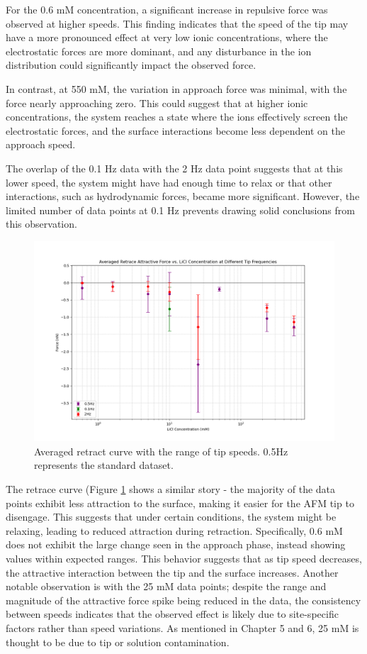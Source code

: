 For the 0.6 mM concentration, a significant increase in repulsive force was observed at higher speeds. This finding indicates that the speed of the tip may have a more pronounced effect at very low ionic concentrations, where the electrostatic forces are more dominant, and any disturbance in the ion distribution could significantly impact the observed force.

In contrast, at 550 mM, the variation in approach force was minimal, with the force nearly approaching zero. This could suggest that at higher ionic concentrations, the system reaches a state where the ions effectively screen the electrostatic forces, and the surface interactions become less dependent on the approach speed.

The overlap of the 0.1 Hz data with the 2 Hz data point suggests that at this lower speed, the system might have had enough time to relax or that other interactions, such as hydrodynamic forces, became more significant. However, the limited number of data points at 0.1 Hz prevents drawing solid conclusions from this observation.

\begin{figure}[h!]
\centering
\includegraphics[width=\textwidth]{chapter7/Tip speed/Overall graph retrace.png}
\caption{Averaged retract curve with the range of tip speeds. 0.5Hz represents the standard dataset.}
\label{fig:RetractAverageSpeed}
\end{figure}

The retrace curve (Figure \ref{fig:RetractAverageSpeed} shows a similar story - 
the majority of the data points exhibit less attraction to the surface, making it easier for the AFM tip to disengage. This suggests that under certain conditions, the system might be relaxing, leading to reduced attraction during retraction. Specifically, 0.6 mM does not exhibit the large change seen in the approach phase, instead showing values within expected ranges. This behavior suggests that as tip speed decreases, the attractive interaction between the tip and the surface increases. Another notable observation is with the 25 mM data points; despite the range and magnitude of the attractive force spike being reduced in the data, the consistency between speeds indicates that the observed effect is likely due to site-specific factors rather than speed variations. As mentioned in Chapter 5 and 6, 25 mM is thought to be due to tip or solution contamination.

